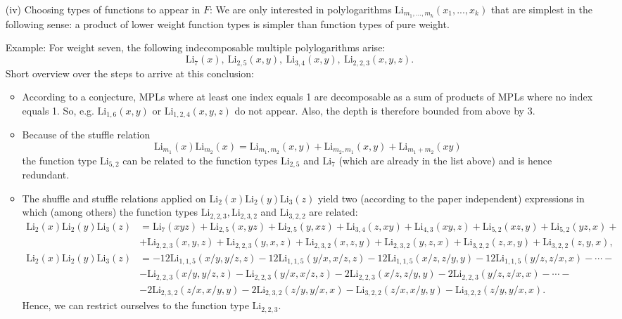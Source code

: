\documentclass[10pt]{article}
\newcommand*{\Li}{\mathrm{Li}}
\begin{document}
\begin{itemize}
\item[(iv)] Choosing types of functions to appear in $F$: We are only interested in polylogarithms $\Li_{m_1, ..., m_k}(x_1, ..., x_k)$ that are simplest in the following sense: a product of lower weight function types is simpler than function types of pure weight.

Example: For weight seven, the following indecomposable multiple polylogarithms arise:
\begin{equation*}
\Li_7(x), \ \Li_{2,5}(x,y), \ \Li_{3,4}(x,y), \ \Li_{2,2,3}(x,y,z).
\end{equation*}
Short overview over the steps to arrive at this conclusion:
\begin{itemize}
\item According to a conjecture, MPLs where at least one index equals 1 are decomposable as a sum of products of MPLs where no index equals 1. So, e.g. $\Li_{1,6}(x,y)$ or $\Li_{1,2,4}(x,y,z)$ do not appear. Also, the depth is therefore bounded from above by 3.
\item Because of the stuffle relation
\begin{equation*}
\Li_{m_1}(x) \Li_{m_2}(x) = \Li_{m_1, m_2}(x,y) + \Li_{m_2, m_1}(x,y) + \Li_{m_1 + m_2}(xy)
\end{equation*}
the function type $\Li_{5,2}$ can be related to the function types $\Li_{2,5}$ and $\Li_{7}$ (which are already in the list above) and is hence redundant.
\item The shuffle and stuffle relations applied on $\Li_2(x) \Li_2(y) \Li_3(z)$ yield two (according to the paper independent) expressions in which (among others) the function types $\Li_{2,2,3}, \Li_{2,3,2}$ and $\Li_{3,2,2}$ are related:
\begin{equation*}
\begin{split}
\Li_{2}(x) \Li_2(y) \Li_3(z) & = \Li_{7}(xyz) + \Li_{2,5}(x,yz) + \Li_{2,5}(y,xz) + \Li_{3,4}(z,xy) + \Li_{4,3}(xy,z) + \Li_{5,2}(xz,y) + \Li_{5,2}(yz,x) + \\ & + \Li_{2,2,3}(x,y,z) + \Li_{2,2,3}(y,x,z) + \Li_{2,3,2}(x,z,y) + \Li_{2,3,2}(y,z,x) + \Li_{3,2,2}(z,x,y) + \Li_{3,2,2}(z,y,x),
\end{split}
\end{equation*}
\begin{equation*}
\begin{split}
\Li_2(x) \Li_2(y) \Li_3(z) & = -12 \Li_{1,1,5}(x/y, y/z, z) - 12 \Li_{1,1,5}(y/x, x/z, z) - 12 \Li_{1,1,5}(x/z, z/y, y) - 12 \Li_{1,1,5}(y/z, z/x, x) - \cdots - \\ & - \Li_{2,2,3}(x/y, y/z, z) - \Li_{2,2,3}(y/x, x/z, z) - 2 \Li_{2,2,3}(x/z, z/y, y) - 2 \Li_{2,2,3}(y/z, z/x, x) - \cdots - \\ & -2 \Li_{2,3,2}(z/x, x/y, y) - 2 \Li_{2,3,2}(z/y, y/x, x)-\Li_{3,2,2}(z/x, x/y, y) - \Li_{3,2,2}(z/y, y/x, x).
\end{split}
\end{equation*}
Hence, we can restrict ourselves to the function type $\Li_{2,2,3}$.
\end{itemize}


\end{itemize}
\end{document}
